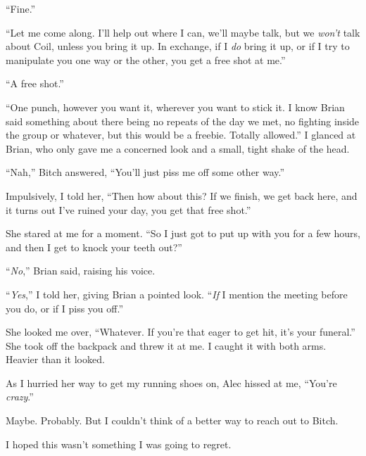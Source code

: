 ``Fine.''



``Let me come along.  I'll help out where I can, we'll maybe talk, but we \emph{won't} talk about Coil, unless you bring it up.  In exchange, if I \emph{do} bring it up, or if I try to manipulate you one way or the other, you get a free shot at me.''



``A free shot.''



``One punch, however you want it, wherever you want to stick it.  I know Brian said something about there being no repeats of the day we met, no fighting inside the group or whatever, but this would be a freebie.  Totally allowed.''  I glanced at Brian, who only gave me a concerned look and a small, tight shake of the head.



``Nah,'' Bitch answered, ``You'll just piss me off some other way.''



Impulsively, I told her, ``Then how about this?  If we finish, we get back here, and it turns out I've ruined your day, you get that free shot.''



She stared at me for a moment.  ``So I just got to put up with you for a few hours, and then I get to knock your teeth out?''



``\emph{No},'' Brian said, raising his voice.



``\emph{Yes},'' I told her, giving Brian a pointed look.  ``\emph{If }I mention the meeting before you do, or if I piss you off.''



She looked me over, ``Whatever.  If you're that eager to get hit, it's your funeral.''  She took off the backpack and threw it at me.  I caught it with both arms.  Heavier than it looked.



As I hurried her way to get my running shoes on, Alec hissed at me, ``You're \emph{crazy}.''



Maybe.  Probably.  But I couldn't think of a better way to reach out to Bitch.



I hoped this wasn't something I was going to regret.


